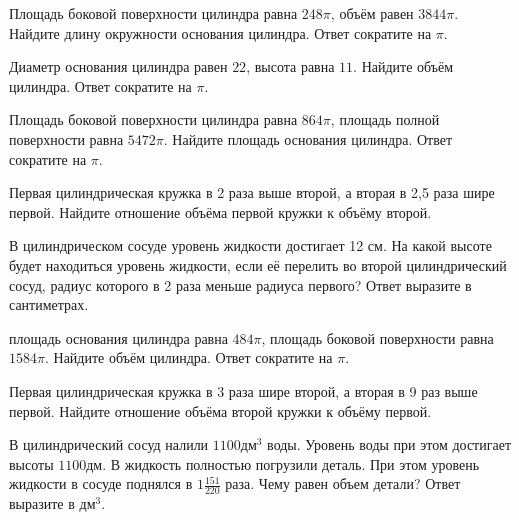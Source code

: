 \documentclass[4apaper]{article}
\begin{document}
\begin{taskBN}{64}
Площадь боковой поверхности цилиндра равна $248\pi$, объём равен $3844\pi$. Найдите длину окружности основания цилиндра. Ответ сократите на $\pi$.
\end{taskBN}

\begin{taskBN}{65}
Диаметр основания цилиндра равен $22$, высота равна $11$. Найдите объём цилиндра. Ответ сократите на $\pi$.
\end{taskBN}

\begin{taskBN}{66}
Площадь боковой поверхности цилиндра равна $864\pi$, площадь полной поверхности равна $5472\pi$. Найдите площадь основания цилиндра. Ответ сократите на $\pi$.
\end{taskBN}

\begin{taskBN}{67}
 Первая цилиндрическая кружка в 2 раза выше второй, а вторая в 2,5 раза шире первой. Найдите отношение объёма первой кружки к объёму второй.
\end{taskBN}

\begin{taskBN}{68}
В цилиндрическом сосуде уровень жидкости достигает 12 см. На какой высоте будет находиться уровень жидкости, если её перелить во второй цилиндрический сосуд, радиус которого в 2 раза меньше радиуса первого? Ответ выразите в сантиметрах.
\end{taskBN}

\begin{taskBN}{69}
площадь основания цилиндра равна $484\pi$, площадь боковой поверхности равна $1584\pi$. Найдите объём цилиндра. Ответ сократите на $\pi$.
\end{taskBN}

\begin{taskBN}{70}
 Первая цилиндрическая кружка в 3 раза шире второй, а вторая в 9 раз выше первой. Найдите отношение объёма второй кружки к объёму первой.
\end{taskBN}

\begin{taskBN}{71}
В цилиндрический сосуд налили $1100\mbox{дм}^3$ воды. Уровень воды при этом достигает высоты $1100$дм. В жидкость полностью погрузили деталь. При этом уровень жидкости в сосуде поднялся в ${1}\frac{151}{220}$ раза. Чему равен объем детали? Ответ выразите в $\mbox{дм}^3$.
\end{taskBN}
\end{document}
